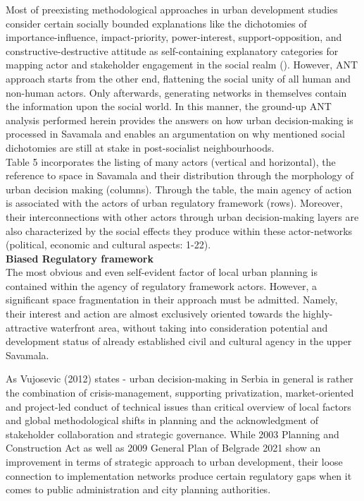 \documentclass[11pt]{report}
\begin{document}
Most of preexisting methodological approaches in urban development studies consider certain socially bounded explanations {like the dichotomies of importance-influence, impact-priority, power-interest, support-opposition, and constructive-destructive attitude} as self-containing explanatory categories for mapping actor and stakeholder engagement in the social realm (\cite{Mathur}).
However, ANT approach starts from the other end, flattening the social unity of all human and non-human actors.
Only afterwards, generating networks in themselves contain the information upon the social world.
In this manner, the ground-up ANT analysis performed herein provides the answers on how urban decision-making is processed in Savamala and enables an argumentation on why mentioned social dichotomies are still at stake in post-socialist neighbourhoods.
\\
Table 5 %
incorporates the listing of many actors (vertical and horizontal), the reference to space in Savamala and their distribution through the morphology of urban decision making (columns).
Through the table, the main agency of action is associated with the actors of urban regulatory framework (rows).
Moreover, their interconnections  with other actors through urban decision-making layers are also characterized by the social effects they produce within these actor-networks (political, economic and cultural aspects: 1-22).
\\

\textbf{Biased Regulatory framework}
\\
The most obvious and even self-evident factor of local urban planning is contained within the agency of regulatory framework actors.
However, a significant space fragmentation in their approach must be admitted. Namely, their interest and action are almost exclusively oriented towards the highly-attractive waterfront area, without taking into consideration potential and development status of already established civil and cultural agency in the upper Savamala.

As Vujosevic (2012) states - urban decision-making in Serbia in general is rather the combination of crisis-management, supporting privatization, market-oriented and project-led conduct of technical issues than critical overview of local factors and global methodological shifts in planning and the acknowledgment of stakeholder collaboration and strategic governance.
While 2003 Planning and Construction Act as well as 2009 General Plan of Belgrade 2021 show an improvement in terms of strategic approach to urban development, their loose connection to implementation networks produce certain regulatory gaps when it comes to public administration and city planning authorities.
\end{document}
